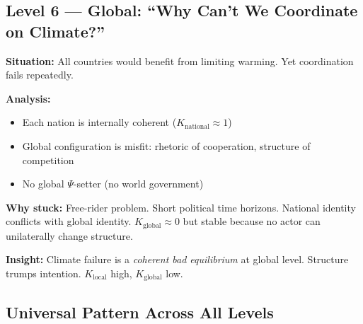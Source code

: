 \subsection{Level 6 — Global: ``Why Can't We Coordinate on Climate?''}

\begin{tcolorbox}[colback=orange!5!white, colframe=orange!75!black,
    title=\textbf{Worked Example L=6: Global Coordination Failure}]

\textbf{Situation:} All countries would benefit from limiting warming.
Yet coordination fails repeatedly.

\textbf{Analysis:}
\begin{itemize}[nosep]
    \item Each nation is internally coherent ($K_{\text{national}} \approx 1$)
    \item Global configuration is misfit: rhetoric of cooperation, structure of competition
    \item No global $\Psi$-setter (no world government)
\end{itemize}

\textbf{Why stuck:}
Free-rider problem. Short political time horizons. National identity conflicts with global identity.
$K_{\text{global}} \approx 0$ but stable because no actor can unilaterally change structure.

\textbf{Insight:} Climate failure is a \emph{coherent bad equilibrium} at global level.
Structure trumps intention. $K_{\text{local}}$ high, $K_{\text{global}}$ low.

\end{tcolorbox}


\subsection{Universal Pattern Across All Levels}

